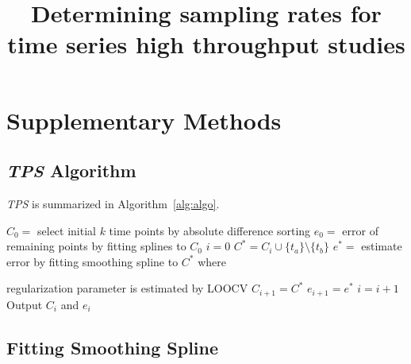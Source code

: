\documentclass[10pt]{article}
\newcommand{\TPS}{\textit{TPS}\xspace}
\begin{document}
\title{Determining sampling rates for time series high throughput studies}
\date{}
\author{}

\maketitle

\tableofcontents
\listoffigures
\listoftables

\section{Supplementary Methods}

\subsection{\TPS Algorithm}

\TPS is summarized in Algorithm~\ref{alg:algo}.

\begin{algorithm}
\caption{\TPS: Iterative $k$-point selection}
\label{alg:algo}
\begin{algorithmic}[1]
\State $C_{0} = $ select initial $k$ time points by absolute difference sorting
\State $e_{0} = $ error of remaining points by fitting splines to $C_{0}$
\State $i=0$
\Do 
{}
\State $C^{*} = C_{i} \cup \{ t_{a} \} \setminus \{ t_{b}\}$ 
\State $e^{*} = $ estimate error by fitting smoothing spline to
$C^{*}$ where \par 
\hspace{1.62cm} regularization parameter is estimated by LOOCV
\State $C_{i+1} = C^{*}$ 
\State $e_{i+1} = e^{*}$
\EndIf
\State $i = i+1$
\EndFor
{}
\State Output $C_{i}$ and $e_{i}$
\EndProcedure
\end{algorithmic}
\end{algorithm}


\subsection{Fitting Smoothing Spline}
\end{document}
